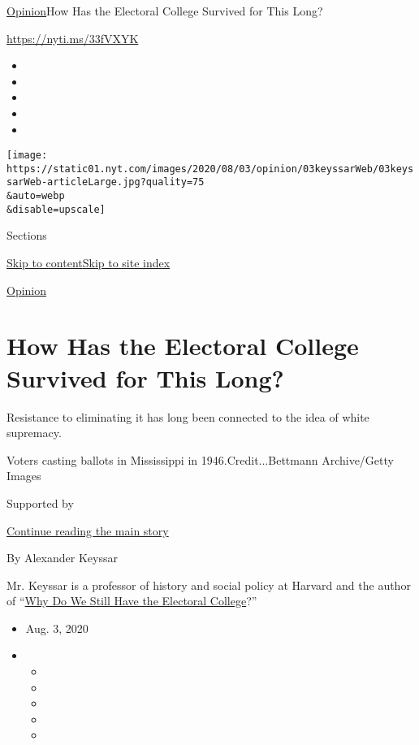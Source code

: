 \href{/section/opinion}{Opinion}\textbar{}How Has the Electoral College
Survived for This Long?

\url{https://nyti.ms/33fVXYK}

\begin{itemize}
\item
\item
\item
\item
\item
\end{itemize}

\texttt{[image: https://static01.nyt.com/images/2020/08/03/opinion/03keyssarWeb/03keyssarWeb-articleLarge.jpg?quality=75\\\&auto=webp\\\&disable=upscale]}

Sections

\protect\hyperlink{site-content}{Skip to
content}\protect\hyperlink{site-index}{Skip to site index}

\href{/section/opinion}{Opinion}

\hypertarget{how-has-the-electoral-college-survived-for-this-long}{%
\section{How Has the Electoral College Survived for This
Long?}\label{how-has-the-electoral-college-survived-for-this-long}}

Resistance to eliminating it has long been connected to the idea of
white supremacy.

Voters casting ballots in Mississippi in 1946.Credit...Bettmann
Archive/Getty Images

Supported by

\protect\hyperlink{after-sponsor}{Continue reading the main story}

By Alexander Keyssar

Mr. Keyssar is a professor of history and social policy at Harvard and
the author of
``\href{https://www.hup.harvard.edu/catalog.php?isbn=9780674660151\#:~:text=After\%20tracing\%20the\%20Electoral\%20College's,showing\%20why\%20each\%20has\%20failed.}{Why
Do We Still Have the Electoral College}?''

\begin{itemize}
\item
  Aug. 3, 2020
\item
  \begin{itemize}
  \item
  \item
  \item
  \item
  \item
  \end{itemize}
\end{itemize}

